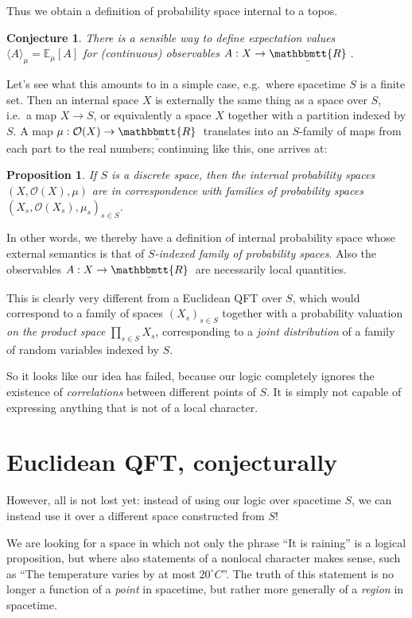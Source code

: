 \documentclass[11pt, oneside, article]{memoir}
\theoremstyle{plain}
\newtheorem{proposition}[theorem]{Proposition}
\newtheorem{conjecture}[theorem]{Conjecture}
\theoremstyle{definition}
\theoremstyle{remark}
\newcommand{\Open}[1]{\mathcal{O}(#1)}
\newcommand{\ubar}[1]{\underaccent{\bar}{#1}}
\newcommand{\internal}[1]{\raisebox{-.03ex}{$\mathbbmtt{#1}$}}
\newcommand{\hs}{\hspace{1.1pt}}
\newcommand{\tRR}{\internal{R}\hs}
\newcommand{\tLR}{\ubar{\tRR}\hs}
\begin{document}
Thus we obtain a definition of probability space internal to a topos.

\begin{conjecture}
There is a sensible way to define expectation values $\langle A \rangle_\mu = \mathbb{E}_\mu[A]$ for (continuous) observables $A : X \to \tLR$.
\end{conjecture}

Let's see what this amounts to in a simple case, e.g.~where spacetime $S$ is a finite set. Then an internal space $X$ is externally the same thing as a space over $S$, i.e.~a map $X\to S$, or equivalently a space $X$ together with a partition indexed by $S$. A map $\mu : \Open{X} \to \tLR$ translates into an $S$-family of maps from each part to the real numbers; continuing like this, one arrives at:

\begin{proposition}
If $S$ is a discrete space, then the internal probability spaces $(X,\Open{X},\mu)$ are in correspondence with families of probability spaces $(X_s,\Open{X_s},\mu_s)_{s\in S}$.
\end{proposition}

In other words, we thereby have a definition of internal probability space whose external semantics is that of \emph{$S$-indexed family of probability spaces}. Also the observables $A : X \to \tLR$ are necessarily local quantities.

This is clearly very different from a Euclidean QFT over $S$, which would correspond to a family of spaces $(X_s)_{s\in S}$ together with a probability valuation \emph{on the product space} $\prod_{s\in S} X_s$, corresponding to a \emph{joint distribution} of a family of random variables indexed by $S$.

So it looks like our idea has failed, because our logic completely ignores the existence of \emph{correlations} between different points of $S$. It is simply not capable of expressing anything that is not of a local character.

\chapter{Euclidean QFT, conjecturally}

However, all is not lost yet: instead of using our logic over spacetime $S$, we can instead use it over a different space constructed from $S$!

We are looking for a space in which not only the phrase ``It is raining'' is a logical proposition, but where also statements of a nonlocal character makes sense, such as ``The temperature varies by at most $20^\circ C$''. The truth of this statement is no longer a function of a \emph{point} in spacetime, but rather more generally of a \emph{region} in spacetime.
\end{document}
